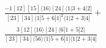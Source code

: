 \documentclass[varwidth, border=5pt]{standalone}
\begin{document}
\begin{my}
$\begin{gathered}
\scriptscriptstyle\frac{-1[12][15]⟨16⟩[24]⟨1|3+4|2]}{[23][34]⟨1|5+6|1]^2⟨1|2+3|4]}+\\
\scriptscriptstyle\frac{3[12]⟨16⟩[24]⟨6|1+5|2]}{[23][34]⟨56⟩⟨1|5+6|1]⟨1|2+3|4]}\phantom{+}
\end{gathered}$
\end{my}
\end{document}
